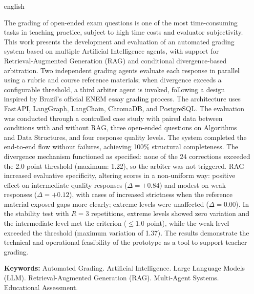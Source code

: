 \begin{resumo}[Abstract]
 \begin{otherlanguage*}{english}

The grading of open-ended exam questions is one of the most time-consuming tasks in teaching practice, subject to high time costs and evaluator subjectivity. This work presents the development and evaluation of an automated grading system based on multiple Artificial Intelligence agents, with support for Retrieval-Augmented Generation (RAG) and conditional divergence-based arbitration. Two independent grading agents evaluate each response in parallel using a rubric and course reference materials; when divergence exceeds a configurable threshold, a third arbiter agent is invoked, following a design inspired by Brazil's official ENEM essay grading process. The architecture uses FastAPI, LangGraph, LangChain, ChromaDB, and PostgreSQL. The evaluation was conducted through a controlled case study with paired data between conditions with and without RAG, three open-ended questions on Algorithms and Data Structures, and four response quality levels. The system completed the end-to-end flow without failures, achieving 100\% structural completeness. The divergence mechanism functioned as specified: none of the 24 corrections exceeded the 2.0-point threshold (maximum: 1.22), so the arbiter was not triggered. RAG increased evaluative specificity, altering scores in a non-uniform way: positive effect on intermediate-quality responses ($\Delta = +0.84$) and modest on weak responses ($\Delta = +0.12$), with cases of increased strictness when the reference material exposed gaps more clearly; extreme levels were unaffected ($\Delta = 0.00$). In the stability test with $R=3$ repetitions, extreme levels showed zero variation and the intermediate level met the criterion ($\leq 1.0$ point), while the weak level exceeded the threshold (maximum variation of 1.37). The results demonstrate the technical and operational feasibility of the prototype as a tool to support teacher grading.

\textbf{Keywords:} Automated Grading. Artificial Intelligence. Large Language Models (LLM). Retrieval-Augmented Generation (RAG). Multi-Agent Systems. Educational Assessment.

 \end{otherlanguage*}
\end{resumo}
